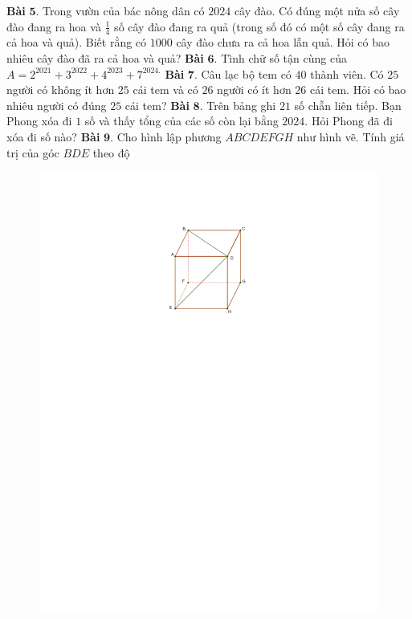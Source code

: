 \begin{multicols}{2}
\begin{table}[H]
\begin{tabular}{ccc}
		\end{tabular}	
		\vspace*{-10pt}
	\end{table}
	\textbf{\color{toancuabi}Bài} $\pmb{5.}$ Trong vườn của bác nông dân có $2024$ cây đào. Có đúng một nửa số cây đào đang ra hoa và $\frac{1}{4}$ số cây đào đang ra quả (trong số đó có một số cây đang ra cả hoa và quả). Biết rằng có $1000$ cây đào chưa ra cả hoa lẫn quả. Hỏi có bao nhiêu cây đào đã ra cả hoa và quả?
	\vskip 0.1cm
	\textbf{\color{toancuabi}Bài} $\pmb{6.}$ Tình chữ số tận cùng của $A = 2^{2021} + 3^{2022} + 4^{2023} + 7^{2024.}$
	\vskip 0.1cm
	\textbf{\color{toancuabi}Bài} $\pmb{7.}$ Câu lạc bộ tem có $40$ thành viên. Có $25$ người có không ít hơn $25$ cái tem và có $26$ người có ít hơn $26$ cái tem. Hỏi có bao nhiêu người có đúng $25$ cái tem?
	\vskip 0.1cm
	\textbf{\color{toancuabi}Bài} $\pmb{8.}$ Trên bảng ghi $21$ số chẵn liên tiếp. Bạn Phong xóa đi $1$ số và thấy tổng của các số còn lại bằng $2024$. Hỏi Phong đã đi xóa đi số nào?
	\vskip 0.1cm
	\textbf{\color{toancuabi}Bài} $\pmb{9.}$ Cho hình lập phương $ABCDEFGH$ như hình vẽ. Tính giá trị của góc $BDE$ theo độ
	\begin{figure}[H]
		\vspace*{-5pt}
		\centering
		\captionsetup{labelformat= empty, justification=centering}
		\includegraphics[width= 0.7\linewidth]{bai9k2}
		\vspace*{-10pt}

\end{figure}
\end{multicols}
